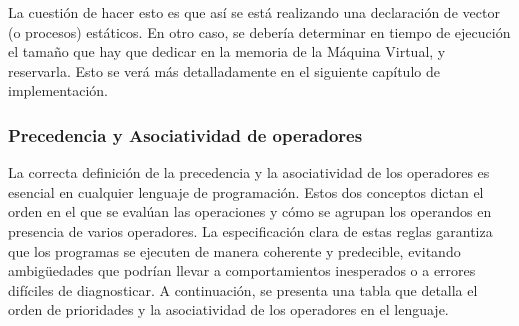 La cuestión de hacer esto es que así se está realizando una declaración de vector (o procesos) estáticos. En otro caso, se debería determinar en tiempo de ejecución el tamaño que hay que dedicar en la memoria de la Máquina Virtual, y reservarla. Esto se verá más detalladamente en el siguiente capítulo de implementación.

\subsubsection{Precedencia y Asociatividad de operadores}\label{subsec:precOperadoresLamport}

La correcta definición de la precedencia y la asociatividad de los operadores es esencial en cualquier lenguaje de programación. Estos dos conceptos dictan el orden en el que se evalúan las operaciones y cómo se agrupan los operandos en presencia de varios operadores. La especificación clara de estas reglas garantiza que los programas se ejecuten de manera coherente y predecible, evitando ambigüedades que podrían llevar a comportamientos inesperados o a errores difíciles de diagnosticar. A continuación, se presenta una tabla que detalla el orden de prioridades y la asociatividad de los operadores en el lenguaje.

\newpage

